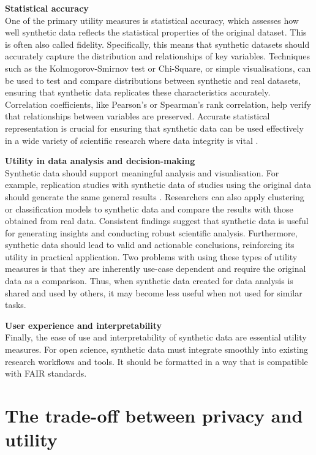 \textbf{Statistical accuracy} \\
One of the primary utility measures is statistical accuracy, which assesses how well synthetic data reflects the statistical properties of the original dataset. This is often also called fidelity. Specifically, this means that synthetic datasets should accurately capture the distribution and relationships of key variables. Techniques such as the Kolmogorov-Smirnov test or Chi-Square, or simple visualisations, can be used to test and compare distributions between synthetic and real datasets, ensuring that synthetic data replicates these characteristics accurately. Correlation coefficients, like Pearson's or Spearman's rank correlation, help verify that relationships between variables are preserved. Accurate statistical representation is crucial for ensuring that synthetic data can be used effectively in a wide variety of scientific research where data integrity is vital \cite{dankar2021fake,el2020seven,arnold2020really}.

\textbf{Utility in data analysis and decision-making} \\
Synthetic data should support meaningful analysis and visualisation. For example, replication studies with synthetic data of studies using the original data should generate the same general results \cite{braddon2023exploring}. Researchers can also apply clustering or classification models to synthetic data and compare the results with those obtained from real data. Consistent findings suggest that synthetic data is useful for generating insights and conducting robust scientific analysis. Furthermore, synthetic data should lead to valid and actionable conclusions, reinforcing its utility in practical application. Two problems with using these types of utility measures is that they are inherently use-case dependent and require the original data as a comparison. Thus, when synthetic data created for data analysis is shared and used by others, it may become less useful when not used for similar tasks.

\textbf{User experience and interpretability} \\
Finally, the ease of use and interpretability of synthetic data are essential utility measures. For open science, synthetic data must integrate smoothly into existing research workflows and tools. It should be formatted in a way that is compatible with FAIR standards.


\section{The trade-off between privacy and utility}

